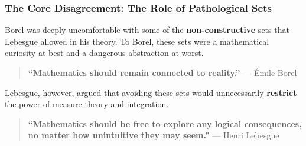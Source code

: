 \subsubsection{The Core Disagreement: The Role of Pathological Sets}

Borel was deeply uncomfortable with some of the \textbf{non-constructive} sets that Lebesgue allowed in his theory. To Borel, these sets were a mathematical curiosity at best and a dangerous abstraction at worst.

\begin{quote}
\textbf{“Mathematics should remain connected to reality.”} — Émile Borel
\end{quote}

Lebesgue, however, argued that avoiding these sets would unnecessarily \textbf{restrict} the power of measure theory and integration.

\begin{quote}
\textbf{“Mathematics should be free to explore any logical consequences, no matter how unintuitive they may seem.”} — Henri Lebesgue
\end{quote}




